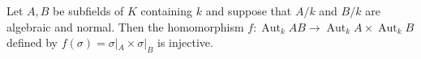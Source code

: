 Let $A, B$ be subfields of $K$ containing $k$ and suppose that $A/k$ and $B/k$ are algebraic and normal. Then the homomorphism $f: \operatorname{Aut}_k AB \to \operatorname{Aut}_k A \times \operatorname{Aut}_k B$ defined by $f(\sigma) = \sigma|_A \times \sigma|_B$ is injective.
